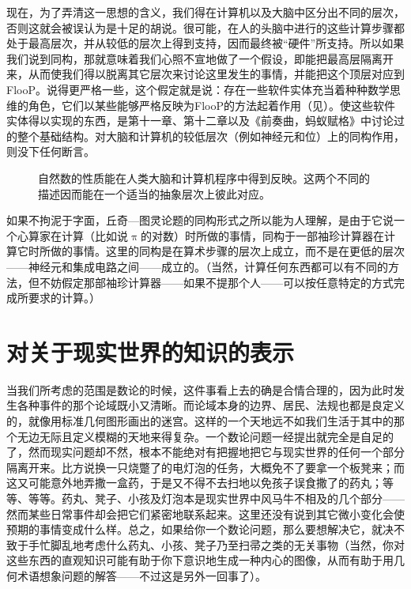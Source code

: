 现在，为了弄清这一思想的含义，我们得在计算机以及大脑中区分出不同的层次，否则这就会被误认为是十足的胡说。很可能，在人的头脑中进行的这些计算步骤都处于最高层次，并从较低的层次上得到支持，因而最终被“硬件”所支持。所以如果我们说到同构，那就意味着我们心照不宣地做了一个假设，即能把最高层隔离开来，从而使我们得以脱离其它层次来讨论这里发生的事情，并能把这个顶层对应到FlooP。说得更严格一些，这个假定就是说：存在一些软件实体充当着种种数学思维的角色，它们以某些能够严格反映为FlooP的方法起着作用（见）。使这些软件实体得以实现的东西，是第十一章、第十二章以及《前奏曲，蚂蚁赋格》中讨论过的整个基础结构。对大脑和计算机的较低层次（例如神经元和位）上的同构作用，则没下任何断言。

\begin{figure}
\caption[联系着自然数、计算机和人脑的同构关系。]
  {自然数的性质能在人类大脑和计算机程序中得到反映。这两个不同的描述因而能在一个适当的抽象层次上彼此对应。}
\end{figure}

如果不拘泥于字面，丘奇—图灵论题的同构形式之所以能为人理解，是由于它说一个心算家在计算（比如说$\uppi$的对数）时所做的事情，同构于一部袖珍计算器在计算它时所做的事情。这里的同构是在算术步骤的层次上成立，而不是在更低的层次——神经元和集成电路之间——成立的。（当然，计算任何东西都可以有不同的方法，但不妨假定那部袖珍计算器——如果不提那个人——可以按任意特定的方式完成所要求的计算。）

\section{对关于现实世界的知识的表示}

当我们所考虑的范围是数论的时候，这件事看上去的确是合情合理的，因为此时发生各种事件的那个论域既小又清晰。而论域本身的边界、居民、法规也都是良定义的，就像用标准几何图形画出的迷宫。这样的一个天地远不如我们生活于其中的那个无边无际且定义模糊的天地来得复杂。一个数论问题一经提出就完全是自足的了，然而现实问题却不然，根本不能绝对有把握地把它与现实世界的任何一个部分隔离开来。比方说换一只烧蹩了的电灯泡的任务，大概免不了要拿一个板凳来；而这又可能意外地弄撒一盒药，于是又不得不去扫地以免孩子误食撒了的药丸；等等、等等。药丸、凳子、小孩及灯泡本是现实世界中风马牛不相及的几个部分——然而某些日常事件却会把它们紧密地联系起来。这里还没有说到其它微小变化会使预期的事情变成什么样。总之，如果给你一个数论问题，那么要想解决它，就决不致于手忙脚乱地考虑什么药丸、小孩、凳子乃至扫帚之类的无关事物（当然，你对这些东西的直观知识可能有助于你下意识地生成一种内心的图像，从而有助于用几何术语想象问题的解答——不过这是另外一回事了）。

